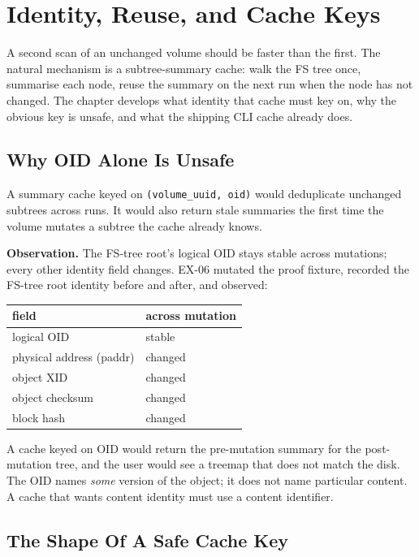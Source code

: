 \chapter{Identity, Reuse, and Cache Keys}

A second scan of an unchanged volume should be faster than the
first. The natural mechanism is a subtree-summary cache: walk the
FS tree once, summarise each node, reuse the summary on the next
run when the node has not changed. The chapter develops what
identity that cache must key on, why the obvious key is unsafe,
and what the shipping CLI cache already does.

\section{Why OID Alone Is Unsafe}

A summary cache keyed on \texttt{(volume\_uuid, oid)} would
deduplicate unchanged subtrees across runs. It would also return
stale summaries the first time the volume mutates a subtree the
cache already knows.

\textbf{Observation.} The FS-tree root's logical OID stays stable
across mutations; every other identity field changes. EX-06 mutated
the proof fixture, recorded the FS-tree root identity before and
after, and observed:

\begin{center}
\begin{tabular}{ll}
\toprule
field & across mutation \\
\midrule
logical OID                & stable \\
physical address (paddr)   & changed \\
object XID                 & changed \\
object checksum            & changed \\
block hash                 & changed \\
\bottomrule
\end{tabular}
\end{center}

A cache keyed on OID would return the pre-mutation summary for the
post-mutation tree, and the user would see a treemap that does not
match the disk. The OID names \emph{some} version of the object;
it does not name particular content. A cache that wants content
identity must use a content identifier.

\section{The Shape Of A Safe Cache Key}

